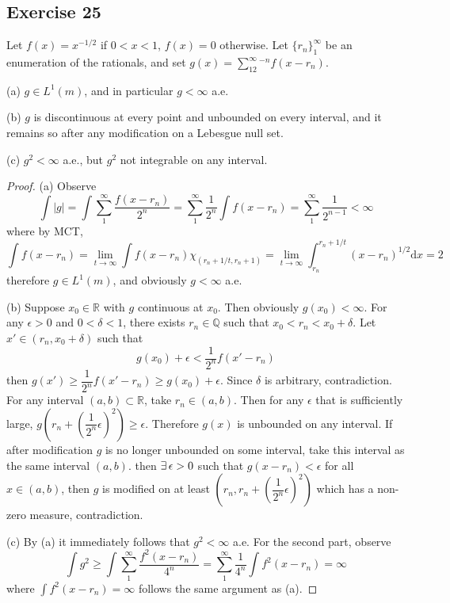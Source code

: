 \subsection*{Exercise 25}
Let $f(x)=x^{-1/2}$ if $0<x<1$, $f(x)=0$ otherwise. Let $\{r_n\}^\infty_1$ be an enumeration of the rationals, and set $g(x)=\sum^\infty_12^{-n}f(x-r_n)$.
\par (a) $g\in L^1(m)$, and in particular $g<\infty$ a.e.
\par (b) $g$ is discontinuous at every point and unbounded on every interval, and it remains so after any modification on a Lebesgue null set.
\par (c) $g^2<\infty$ a.e., but $g^2$ not integrable on any interval.
\begin{proof}
    (a) Observe
    $$
    \int |g|=\int \sum^\infty_1\dfrac{f(x-r_n)}{2^n}=\sum^\infty_1\dfrac{1}{2^n}\int f(x-r_n)=\sum^\infty_1\dfrac{1}{2^{n-1}}<\infty
    $$
    where by MCT,
    $$
    \int f(x-r_n)=\lim_{t\to\infty}\int f(x-r_n)\chi_{(r_n+1/t,r_n+1)}=\lim_{t\to\infty}\int^{r_n+1/t}_{r_n}(x-r_n)^{1/2}\mathrm{d}x=2
    $$
    therefore $g\in L^1(m)$, and obviously $g<\infty$ a.e.
    \par (b) Suppose $x_0\in\mathbb{R}$ with $g$ continuous at $x_0$. Then obviously $g(x_0)<\infty$. For any $\epsilon>0$ and $0<\delta<1$, there exists $r_n\in\mathbb{Q}$ such that $x_0<r_n<x_0+\delta$. Let $x'\in(r_n,x_0+\delta)$ such that
    $$
    g(x_0)+\epsilon<\dfrac{1}{2^n}f(x'-r_n)
    $$
    then $g(x')\ge\dfrac{1}{2^n}f(x'-r_n)\ge g(x_0)+\epsilon$. Since $\delta$ is arbitrary, contradiction. For any interval $(a,b)\subset\mathbb{R}$, take $r_n\in(a,b)$. Then for any $\epsilon$ that is sufficiently large, $g(r_n+(\dfrac{1}{2^n}\epsilon)^2)\ge\epsilon$. Therefore $g(x)$ is unbounded on any interval. If after modification $g$ is no longer unbounded on some interval, take this interval as the same interval $(a,b)$. then $\exists\, \epsilon>0$ such that $g(x-r_n)<\epsilon$ for all $x\in(a,b)$, then $g$ is modified on at least $(r_n,r_n+(\dfrac{1}{2^n}\epsilon)^2)$ which has a non-zero measure, contradiction.
    \par (c) By (a) it immediately follows that $g^2<\infty$ a.e. For the second part, observe
    $$
    \int g^2\ge\int\sum_1^\infty\dfrac{f^2(x-r_n)}{4^n}=\sum^\infty_1\dfrac{1}{4^n}\int f^2(x-r_n)=\infty
    $$
    where $\int f^2(x-r_n)=\infty$ follows the same argument as (a).
\end{proof}

